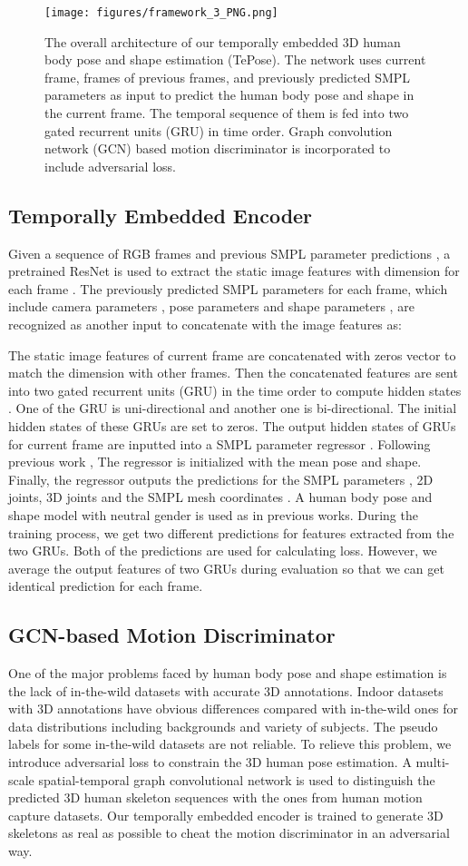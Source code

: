 \documentclass[10pt,twocolumn,letterpaper]{article}
\newcommand{\framework}{
\begin{figure*}[t]
  \centering
  \texttt{[image: figures/framework\_3\_PNG.png]}
  \caption{The overall architecture of our temporally embedded 3D human body pose and shape estimation (TePose). The network uses current frame,  frames of previous frames, and previously predicted SMPL parameters as input to predict the human body pose and shape in the current frame. The temporal sequence of them is fed into two gated recurrent units (GRU) in time order. Graph convolution network (GCN) based motion discriminator is incorporated to include adversarial loss.}
  \label{fig:frame}
\end{figure*}
}
\begin{document}
\framework


\subsection{Temporally Embedded Encoder}
Given a sequence of RGB frames  and previous SMPL parameter predictions  , a pretrained ResNet is used to extract the static image features  with dimension  for each frame \cite{kolotouros2019learning}. The previously predicted SMPL parameters  for each frame, which include camera parameters , pose parameters  and shape parameters , are recognized as another input to concatenate with the image features as:


The static image features of current frame are concatenated with zeros vector to match the dimension with other frames. Then the concatenated features  are sent into two gated recurrent units (GRU) \cite{cho2014learning} in the time order to compute hidden states . One of the GRU is uni-directional and another one is bi-directional. The initial hidden states of these GRUs are set to zeros. The output hidden states of GRUs for current frame  are inputted into a SMPL parameter regressor \cite{kolotouros2019learning}. Following previous work \cite{kocabas2020vibe,choi2021beyond}, The regressor is initialized with the mean pose and shape. Finally, the regressor outputs the predictions for the SMPL parameters , 2D joints, 3D joints and the SMPL mesh coordinates . A human body pose and shape model with neutral gender is used as in previous works. During the training process, we get two different predictions for features extracted from the two GRUs. Both of the predictions are used for calculating loss. However, we average the output features of two GRUs during evaluation so that we can get identical prediction for each frame.


\subsection{GCN-based Motion Discriminator}
One of the major problems faced by human body pose and shape estimation is the lack of in-the-wild datasets with accurate 3D annotations. Indoor datasets with 3D annotations have obvious differences compared with in-the-wild ones for data distributions including backgrounds and variety of subjects. The pseudo labels for some in-the-wild datasets are not reliable. To relieve this problem, we introduce adversarial loss to constrain the 3D human pose estimation. A multi-scale spatial-temporal graph convolutional network is used to distinguish the predicted 3D human skeleton sequences with the ones from human motion capture datasets. Our temporally embedded encoder is trained to generate 3D skeletons as real as possible to cheat the motion discriminator in an adversarial way.
\end{document}
